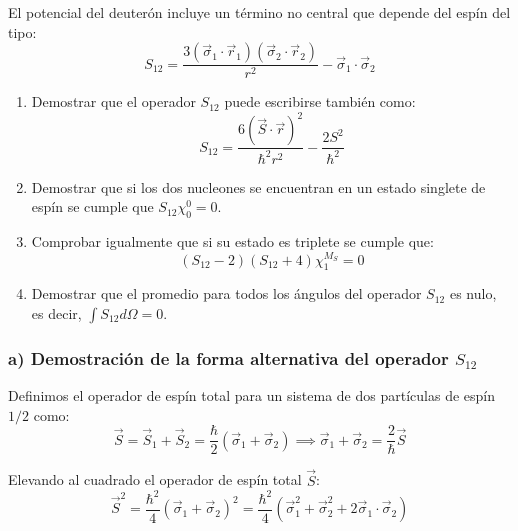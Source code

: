 \newpage
\begin{problema}
El potencial del deuterón incluye un término no central que depende del espín del tipo:
\begin{equation}
S_{12} = \frac{3(\vec{\sigma}_1 \cdot \vec{r}_1)(\vec{\sigma}_2 \cdot \vec{r}_2)}{r^2} - \vec{\sigma}_1 \cdot \vec{\sigma}_2
\end{equation}

\begin{enumerate}[label=\alph*)]
    \item Demostrar que el operador $S_{12}$ puede escribirse también como:
    \begin{equation}
    S_{12} = \frac{6(\vec{S} \cdot \vec{r})^2}{\hbar^2 r^2} - \frac{2 S^2}{\hbar^2}
    \end{equation}

    \item Demostrar que si los dos nucleones se encuentran en un estado singlete de espín se cumple que $S_{12} \chi_0^0 = 0$.

    \item Comprobar igualmente que si su estado es triplete se cumple que:
    \begin{equation}
    (S_{12} - 2)(S_{12} + 4)\chi_1^{M_S} = 0
    \end{equation}

    \item Demostrar que el promedio para todos los ángulos del operador $S_{12}$ es nulo, es decir, $\int S_{12} d\Omega = 0$.
\end{enumerate}

\tcblower

\subsubsection*{a) Demostración de la forma alternativa del operador $S_{12}$}

Definimos el operador de espín total para un sistema de dos partículas de espín $1/2$ como:
\begin{equation}
\vec{S} = \vec{S}_1 + \vec{S}_2 = \frac{\hbar}{2} (\vec{\sigma}_1 + \vec{\sigma}_2) \implies \vec{\sigma}_1 + \vec{\sigma}_2 = \frac{2}{\hbar} \vec{S}
\end{equation}

Elevando al cuadrado el operador de espín total $\vec{S}$:
\begin{equation}
\vec{S}^2 = \frac{\hbar^2}{4} (\vec{\sigma}_1 + \vec{\sigma}_2)^2 = \frac{\hbar^2}{4} \left( \vec{\sigma}_1^2 + \vec{\sigma}_2^2 + 2 \vec{\sigma}_1 \cdot \vec{\sigma}_2 \right)
\end{equation}


\end{problema}
